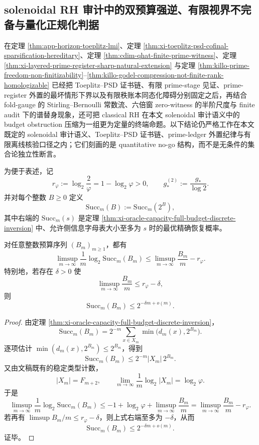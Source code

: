 \subsection{solenoidal RH 审计中的双预算强逆、有限视界不完备与量化正规化判据}\label{subsec:conclusion-solenoidal-rh-double-budget-strong-converse-normalization}
在定理 \ref{thm:app-horizon-toeplitz-lmi}、定理 \ref{thm:xi-toeplitz-psd-cofinal-sparsification-hereditary}、定理 \ref{thm:cdim-qhat-finite-prime-witness}、定理 \ref{thm:xi-layered-prime-register-sharp-natural-extension} 与定理 \ref{thm:killo-prime-freedom-non-finitizability}--\ref{thm:killo-godel-compression-not-finite-rank-homologizable} 已经把 Toeplitz--PSD 证书链、有限 prime-stage 见证、prime-register 外置的最坏情形下界以及有限秩账本同态化障碍分别固定之后，再结合 fold-gauge 的 Stirling--Bernoulli 常数流、六倍窗 zero-witness 的半阶尺度与 finite audit 下的谱替身现象，还可把 classical RH 在本文 solenoidal 审计语义中的 budget obstruction 压缩为一组更为定量的终端命题。以下结论仍严格工作在本文既定的 solenoidal 审计语义、Toeplitz--PSD 证书链、prime-ledger 外置纪律与有限离线核验口径之内；它们刻画的是 quantitative no-go 结构，而不是无条件的集合论独立性断言。

为便于表述，记
\[
r_\varphi:=\log_2\!\frac{2}{\varphi}=1-\log_2\varphi>0,
\qquad
g_*^{(2)}:=\frac{g_*}{\log 2}.
\]
并对每个整数 \(B\ge 0\) 定义
\[
\mathrm{Succ}_m(B):=\mathrm{Succ}_m(2^B),
\]
其中右端的 \(\mathrm{Succ}_m(s)\) 是定理 \ref{thm:xi-oracle-capacity-full-budget-discrete-inversion} 中、允许侧信息字母表大小至多为 \(s\) 时的最优精确恢复概率。

\begin{theorem}[折叠视界反演的强逆定理]\label{thm:conclusion-solenoidal-rh-fold-strong-converse}
对任意整数预算序列 \((B_m)_{m\ge 1}\)，都有
\[
\limsup_{m\to\infty}\frac1m\log_2 \mathrm{Succ}_m(B_m)
\le
\limsup_{m\to\infty}\frac{B_m}{m}-r_\varphi.
\]
特别地，若存在 \(\delta>0\) 使
\[
\limsup_{m\to\infty}\frac{B_m}{m}\le r_\varphi-\delta,
\]
则
\[
\mathrm{Succ}_m(B_m)\le 2^{-\delta m+o(m)}.
\]
\end{theorem}
\begin{proof}
由定理 \ref{thm:xi-oracle-capacity-full-budget-discrete-inversion}，
\[
\mathrm{Succ}_m(B_m)
=
2^{-m}\sum_{x\in X_m}\min\!\bigl(d_m(x),2^{B_m}\bigr).
\]
逐项估计 \(\min(d_m(x),2^{B_m})\le 2^{B_m}\)，得到
\[
\mathrm{Succ}_m(B_m)\le 2^{-m}|X_m|\,2^{B_m}.
\]
又由文稿既有的稳定类型计数，
\[
|X_m|=F_{m+2},
\qquad
\lim_{m\to\infty}\frac1m\log_2|X_m|=\log_2\varphi.
\]
于是
\[
\limsup_{m\to\infty}\frac1m\log_2 \mathrm{Succ}_m(B_m)
\le
-1+\log_2\varphi+\limsup_{m\to\infty}\frac{B_m}{m}
=
\limsup_{m\to\infty}\frac{B_m}{m}-r_\varphi.
\]
若再有 \(\limsup B_m/m\le r_\varphi-\delta\)，则上式右端至多为 \(-\delta\)，从而
\[
\mathrm{Succ}_m(B_m)\le 2^{-\delta m+o(m)}.
\]
证毕。
\end{proof}

